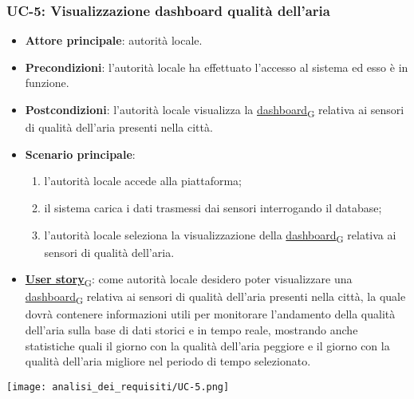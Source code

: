 \subsubsection{UC-5: Visualizzazione dashboard qualità dell'aria}
\begin{itemize}
	\item \textbf{Attore principale}: autorità locale.
	\item \textbf{Precondizioni}: l'autorità locale ha effettuato l'accesso al sistema ed esso è in funzione.
	\item \textbf{Postcondizioni}: l'autorità locale visualizza la \href{https://7last.github.io/docs/pb/documentazione-interna/glossario\#dashboard}{dashboard\textsubscript{G}} relativa
	      ai sensori di qualità dell'aria presenti nella città.
	\item \textbf{Scenario principale}:
	      \begin{enumerate}
		      \item l'autorità locale accede alla piattaforma;
		      \item il sistema carica i dati trasmessi dai sensori interrogando il database;
		      \item l'autorità locale seleziona la visualizzazione della \href{https://7last.github.io/docs/pb/documentazione-interna/glossario\#dashboard}{dashboard\textsubscript{G}} relativa ai sensori di qualità dell'aria.
	      \end{enumerate}
	\item \href{https://7last.github.io/docs/pb/documentazione-interna/glossario\#user-story}{\textbf{User story}\textsubscript{G}}:
	      come autorità locale desidero poter visualizzare una \href{https://7last.github.io/docs/pb/documentazione-interna/glossario\#dashboard}{dashboard\textsubscript{G}} relativa ai sensori di qualità dell'aria presenti nella città, la quale
	      dovrà contenere informazioni utili per monitorare l'andamento della qualità dell'aria sulla base di dati storici e in tempo reale, mostrando
	      anche statistiche quali il giorno con la qualità dell'aria peggiore e il giorno con la qualità dell'aria migliore nel periodo di tempo selezionato.
\end{itemize}
\begin{center}
	\texttt{[image: analisi\_dei\_requisiti/UC-5.png]}
\end{center}


